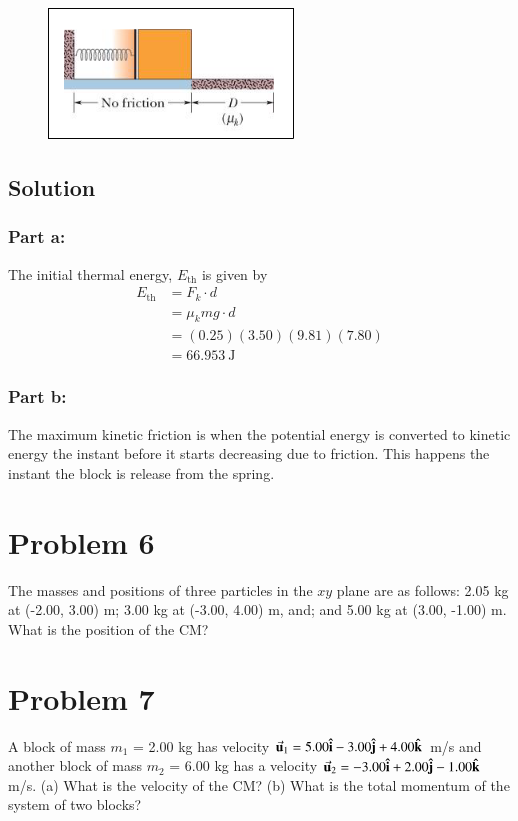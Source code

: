 \documentclass{article}
\newcommand{\Eth}{E_{\text{th}}}
\begin{document}
\begin{figure}[ht]
    \centering
    \includegraphics[scale=.5]{drawing-3.png}
\end{figure}

\subsection*{Solution}
\subsubsection*{Part a:}
The initial thermal energy, $E_{\text{th}}$ is given by
\begin{align*}
	\Eth &= F_k \cdot d \\
	     &= \mu_k mg \cdot d \\
	     &= (0.25)(3.50)(9.81)(7.80) \\
	     &= \boxed{66.953\ \text{J}}
\end{align*}

\subsubsection*{Part b:}
The maximum kinetic friction is when the potential energy is converted to kinetic energy the instant before it starts decreasing due to friction. This happens the instant the block is release from the spring.
\[

\]

\section*{Problem 6}
The masses and positions of three particles in the $xy$ plane are as follows: 2.05 kg at (-2.00, 3.00) m; 3.00 kg
at (-3.00, 4.00) m, and; and 5.00 kg at (3.00, -1.00) m. What is the position of the CM?

\section*{Problem 7}
A block of mass $m_1$ = 2.00 kg has velocity $\va{u}_1 = 5.00 \vu{i} - 3.00 \vu{j} + 4.00 \vu{k}$ m/s and another block of mass
$m_2$ = 6.00 kg has a velocity $\va{u}_2 = -3.00 \vu{i} + 2.00 \vu{j} - 1.00 \vu{k}$ m/s. (a) What is the velocity of the CM? (b)
What is the total momentum of the system of two blocks?
\end{document}
